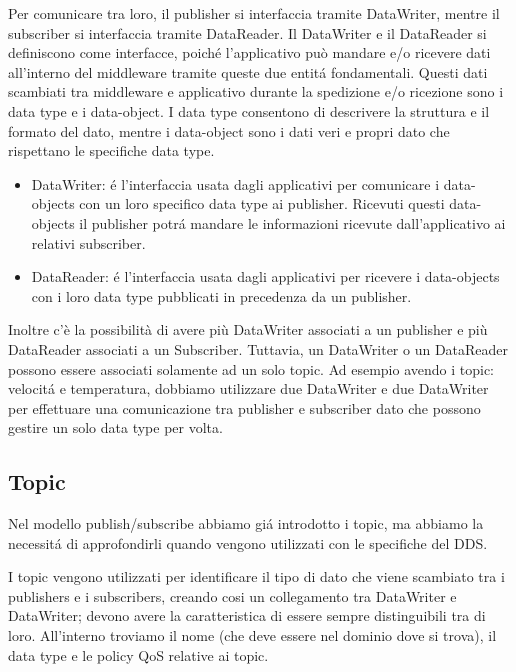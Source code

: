 Per comunicare tra loro, il publisher si interfaccia tramite
DataWriter, 
mentre il subscriber si interfaccia tramite DataReader.
Il DataWriter e il DataReader si definiscono come interfacce, 
poiché l'applicativo
può mandare e/o ricevere dati all'interno del middleware
tramite queste due entitá fondamentali. 
Questi dati scambiati tra middleware e applicativo durante la spedizione e/o 
ricezione sono i data type e i data-object. I data type consentono di 
descrivere la struttura e il formato del dato, mentre i data-object
sono i dati veri e propri dato che rispettano le specifiche data type.
\begin{itemize}
    \item DataWriter: é l'interfaccia usata dagli applicativi 
    per comunicare i
    data-objects con un loro specifico data type ai publisher.
    Ricevuti questi data-objects il publisher potrá mandare le
    informazioni ricevute dall'applicativo ai relativi subscriber.
    \item DataReader: é l'interfaccia usata dagli applicativi per
    ricevere i data-objects con i loro data type pubblicati in
    precedenza da un publisher.
\end{itemize}\cite{dds1.4}
Inoltre c'è la possibilità di avere 
più DataWriter associati a un publisher e più DataReader associati a 
un Subscriber. Tuttavia, un DataWriter o un DataReader possono essere 
associati solamente ad un solo topic.
Ad esempio avendo i topic: velocitá e temperatura, dobbiamo utilizzare
due DataWriter e due DataWriter per effettuare una comunicazione tra
publisher e subscriber dato che possono gestire un solo data type per volta.


\subsection{Topic}
Nel modello publish/subscribe abbiamo giá introdotto i topic, ma 
abbiamo la necessitá di approfondirli quando vengono utilizzati
con le specifiche del DDS.

I topic vengono utilizzati per identificare il tipo di dato che viene
scambiato tra i publishers e i subscribers, creando cosi un collegamento
tra DataWriter e DataWriter;\cite{topicomg}
devono avere la caratteristica di essere sempre
distinguibili tra di loro. All'interno troviamo il nome 
(che deve essere nel dominio dove si trova),
il data type e le policy QoS relative ai topic.




